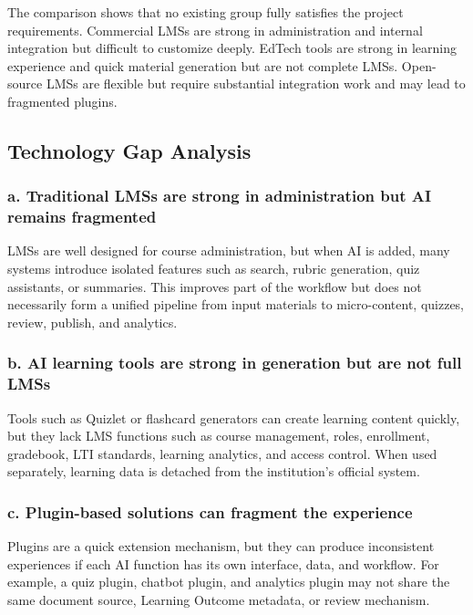 The comparison shows that no existing group fully satisfies the project
requirements. Commercial LMSs are strong in administration and internal
integration but difficult to customize deeply. EdTech tools are strong in
learning experience and quick material generation but are not complete LMSs.
Open-source LMSs are flexible but require substantial integration work and may
lead to fragmented plugins.

\subsection{Technology Gap Analysis}

\subsubsection*{a. Traditional LMSs are strong in administration but AI remains fragmented}

LMSs are well designed for course administration, but when AI is added, many
systems introduce isolated features such as search, rubric generation, quiz
assistants, or summaries. This improves part of the workflow but does not
necessarily form a unified pipeline from input materials to micro-content,
quizzes, review, publish, and analytics.

\subsubsection*{b. AI learning tools are strong in generation but are not full LMSs}

Tools such as Quizlet or flashcard generators can create learning content
quickly, but they lack LMS functions such as course management, roles,
enrollment, gradebook, LTI standards, learning analytics, and access control.
When used separately, learning data is detached from the institution's official
system.

\subsubsection*{c. Plugin-based solutions can fragment the experience}

Plugins are a quick extension mechanism, but they can produce inconsistent
experiences if each AI function has its own interface, data, and workflow. For
example, a quiz plugin, chatbot plugin, and analytics plugin may not share the
same document source, Learning Outcome metadata, or review mechanism.

